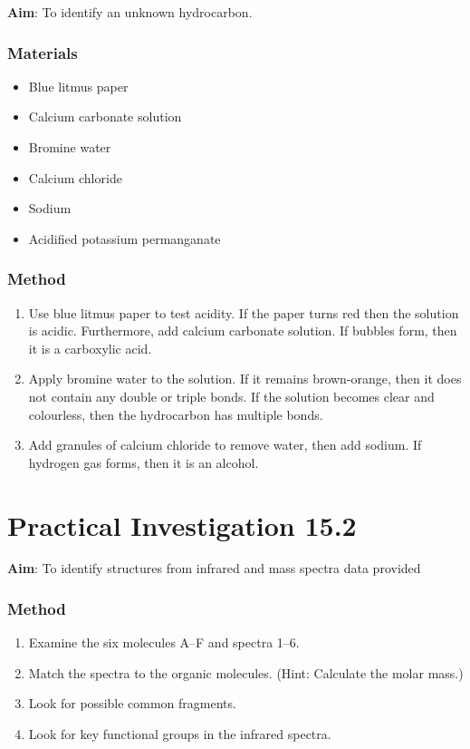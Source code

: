 \documentclass{report}
\begin{document}
	\textbf{Aim}: To identify an unknown hydrocarbon.

	\subsubsection{Materials}

		\begin{itemize}
			\item Blue litmus paper
			\item Calcium carbonate solution
			\item Bromine water
			\item Calcium chloride
			\item Sodium
			\item Acidified potassium permanganate
		\end{itemize}
	
	
	\subsubsection{Method}
		
		\begin{enumerate}
			\item Use blue litmus paper to test acidity. If the paper turns red then the solution is acidic. Furthermore, add calcium carbonate solution. If bubbles form, then it is a carboxylic acid.
			\item Apply bromine water to the solution. If it remains brown-orange, then it does not contain any double or triple bonds. If the solution becomes clear and colourless, then the hydrocarbon has multiple bonds.
			\item Add granules of calcium chloride to remove water, then add sodium. If hydrogen gas forms, then it is an alcohol.
		\end{enumerate}

\newpage

\section*{Practical Investigation 15.2}

	\textbf{Aim}: To identify structures from infrared and mass spectra data provided

	\subsubsection{Method}
	
		\begin{enumerate}
			\item Examine the six molecules A–F and spectra 1–6.
			\item Match the spectra to the organic molecules. (Hint: Calculate the molar mass.)
			\item Look for possible common fragments.
			\item Look for key functional groups in the infrared spectra.
		\end{enumerate}
\end{document}

